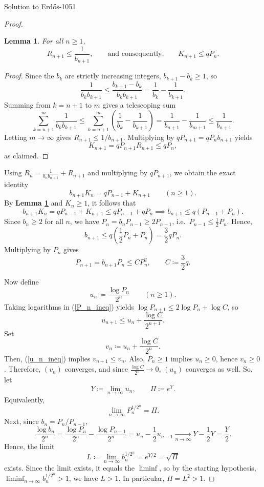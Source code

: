 \documentclass{article}
\theoremstyle{plain}
\newtheorem{lemma}{Lemma}
\theoremstyle{definition}
\begin{document}
\begin{solution}{Solution to Erdős-1051}
\begin{proof}
    \begin{lemma}\label{lem:R_n_upper_bound}
        For all $n\geq 1$, \[R_{n+1}\leq\frac{1}{b_{n+1}},\qquad\text{and consequently,}\qquad K_{n+1}\leq qP_n.\]
    \end{lemma}
    \begin{proof}
        Since the $b_k$ are strictly increasing integers, $b_{k+1}-b_k\geq 1$, so \[\frac{1}{b_k b_{k+1}}\leq\frac{b_{k+1}-b_k}{b_k b_{k+1}}=\frac{1}{b_k}-\frac{1}{b_{k+1}}.\] Summing from $k=n+1$ to $m$ gives a telescoping sum \[\sum_{k=n+1}^{m}\frac{1}{b_kb_{k+1}}\leq\sum_{k=n+1}^{m}\left(\frac{1}{b_k}-\frac{1}{b_{k+1}}\right)=\frac{1}{b_{n+1}}-\frac{1}{b_{m+1}}\leq\frac{1}{b_{n+1}}.\] Letting $m\to\infty$ gives $R_{n+1}\leq 1/b_{n+1}$. Multiplying by $qP_{n+1}=qP_n b_{n+1}$ yields \[K_{n+1}=qP_{n+1}R_{n+1}\leq qP_n,\] as claimed.
    \end{proof}
    Using $R_n=\frac{1}{b_n b_{n+1}}+R_{n+1}$ and multiplying by $qP_{n+1}$, we obtain the exact identity
    \begin{equation}
        b_{n+1}K_n=qP_{n-1}+K_{n+1}\qquad (n\geq 1).
    \end{equation}
    By \textbf{Lemma \ref{lem:R_n_upper_bound}} and $K_n\geq 1$, it follows that \[b_{n+1}K_n=qP_{n-1}+K_{n+1}\leq qP_{n-1}+qP_n\implies b_{n+1}\leq q(P_{n-1}+P_n).\] Since $b_n\geq 2$ for all $n$, we have $P_n=b_n P_{n-1}\geq 2P_{n-1}$, i.e.~$P_{n-1}\leq\frac{1}{2}P_n$. Hence, \[b_{n+1}\leq q\left(\frac{1}{2}P_n+P_n\right)=\frac{3}{2}q P_n.\] Multiplying by $P_n$ gives \begin{equation}\label{P_n_ineq}
        P_{n+1}=b_{n+1}P_n\leq CP_n^2,\qquad C\coloneq\frac{3}{2}q.
    \end{equation}

    Now define \[u_n\coloneq\frac{\log P_n}{2^n}\qquad(n\geq 1).\] Taking logarithms in (\ref{P_n_ineq}) yields $\log P_{n+1}\leq 2\log P_n+\log C$, so \begin{equation}\label{u_n_ineq}
        u_{n+1}\leq u_n+\frac{\log C}{2^{n+1}}.
    \end{equation} Set \[v_n\coloneq u_n+\frac{\log C}{2^n}.\] Then, (\ref{u_n_ineq}) implies $v_{n+1}\leq v_n$. Also, $P_n\geq 1$ implies $u_n\geq 0$, hence $v_n\geq 0$. Therefore, $(v_n)$ converges, and since $\frac{\log C}{2^n}\to 0$, $(u_n)$ converges as well. So, let \[Y\coloneq\lim_{n\to\infty}u_n,\qquad\Pi\coloneq e^Y.\] Equivalently, \begin{equation}\label{P_n_lim_identity}
        \lim_{n\to\infty}P_n^{1/2^n}=\Pi.
    \end{equation} Next, since $b_n=P_n/P_{n-1}$, \[\frac{\log b_n}{2^n}=\frac{\log P_n}{2^n}-\frac{\log P_{n-1}}{2^n}=u_n-\frac{1}{2}u_{n-1}\xrightarrow[n\to \infty]{}Y-\frac{1}{2}Y=\frac{Y}{2}.\] Hence, the limit \[L\coloneq\lim_{n\to\infty} b_n^{1/2^n}=e^{Y/2}=\sqrt{\Pi}\] exists. Since the limit exists, it equals the $\liminf$, so by the starting hypothesis, $\liminf_{n\to\infty} b_n^{1/2^n}>1$, we have $L>1$. In particular, $\Pi=L^2>1$.


\end{proof}
\end{solution}
\end{document}
